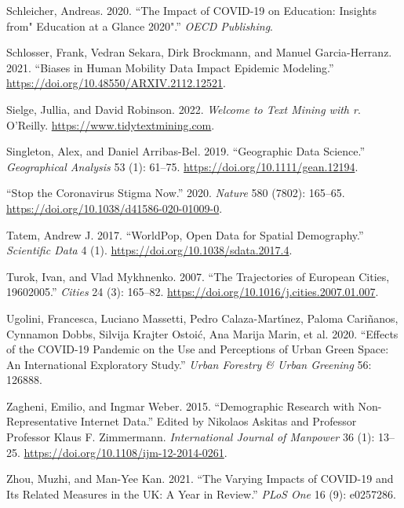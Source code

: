 \documentclass[
  letterpaper,
  DIV=11,
  numbers=noendperiod]{scrreprt}
\newlength{\cslhangindent}
\newlength{\cslentryspacingunit} %
\newenvironment{CSLReferences}[2] %
 {%
  \setlength{\parindent}{0pt}
  \ifodd #1
  \let\oldpar\par
  \def\par{\hangindent=\cslhangindent\oldpar}
  \fi
  \setlength{\parskip}{#2\cslentryspacingunit}
 }%
 {}
\begin{document}
\begin{CSLReferences}{1}{0}
\leavevmode{}%
Schleicher, Andreas. 2020. {``The Impact of COVID-19 on Education:
Insights from" Education at a Glance 2020".''} \emph{OECD Publishing}.

\leavevmode{}%
Schlosser, Frank, Vedran Sekara, Dirk Brockmann, and Manuel
Garcia-Herranz. 2021. {``Biases in Human Mobility Data Impact Epidemic
Modeling.''} \url{https://doi.org/10.48550/ARXIV.2112.12521}.

\leavevmode{}%
Sielge, Jullia, and David Robinson. 2022. \emph{Welcome to Text Mining
with r}. {O'Reilly}. \url{https://www.tidytextmining.com}.

\leavevmode{}%
Singleton, Alex, and Daniel Arribas-Bel. 2019. {``Geographic Data
Science.''} \emph{Geographical Analysis} 53 (1): 61--75.
\url{https://doi.org/10.1111/gean.12194}.

\leavevmode{}%
{``Stop the Coronavirus Stigma Now.''} 2020. \emph{Nature} 580 (7802):
165--65. \url{https://doi.org/10.1038/d41586-020-01009-0}.

\leavevmode{}%
Tatem, Andrew J. 2017. {``WorldPop, Open Data for Spatial Demography.''}
\emph{Scientific Data} 4 (1).
\url{https://doi.org/10.1038/sdata.2017.4}.

\leavevmode{}%
Turok, Ivan, and Vlad Mykhnenko. 2007. {``The Trajectories of European
Cities, 1960{\textendash}2005.''} \emph{Cities} 24 (3): 165--82.
\url{https://doi.org/10.1016/j.cities.2007.01.007}.

\leavevmode{}%
Ugolini, Francesca, Luciano Massetti, Pedro Calaza-Martı́nez, Paloma
Cariñanos, Cynnamon Dobbs, Silvija Krajter Ostoić, Ana Marija Marin, et
al. 2020. {``Effects of the COVID-19 Pandemic on the Use and Perceptions
of Urban Green Space: An International Exploratory Study.''} \emph{Urban
Forestry \& Urban Greening} 56: 126888.

\leavevmode{}%
Zagheni, Emilio, and Ingmar Weber. 2015. {``Demographic Research with
Non-Representative Internet Data.''} Edited by Nikolaos Askitas and
Professor Professor Klaus F. Zimmermann. \emph{International Journal of
Manpower} 36 (1): 13--25.
\url{https://doi.org/10.1108/ijm-12-2014-0261}.

\leavevmode{}%
Zhou, Muzhi, and Man-Yee Kan. 2021. {``The Varying Impacts of COVID-19
and Its Related Measures in the UK: A Year in Review.''} \emph{PLoS One}
16 (9): e0257286.

\end{CSLReferences}
\end{document}

